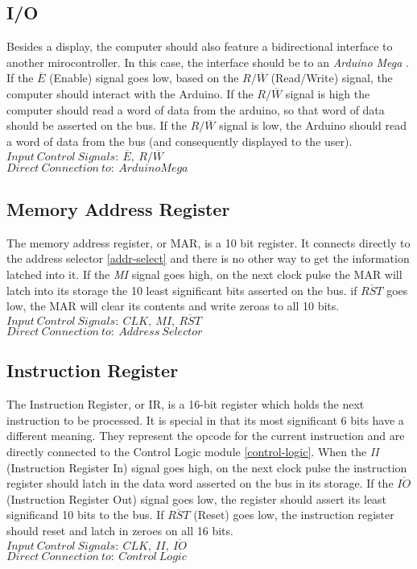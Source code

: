 \subsection{I/O} \label{io}
Besides a display, the computer should also feature a bidirectional interface to another mirocontroller. In this case,
the interface should be to an \emph{Arduino Mega} \cite{arduino2020mega}. If the \emph{$\overline{E}$} (Enable) signal goes low,
based on the \emph{$R/\overline{W}$} (Read/Write) signal, the computer should interact with the Arduino. If the
\emph{$R/\overline{W}$} signal is high the computer should read a word of data from the arduino, so that word of data should be
asserted on the bus. If the \emph{$R/\overline{W}$} signal is low, the Arduino should read a word of data from the bus (and
consequently displayed to the user). \\
\textbf{$Input\:Control\:Signals:\:\overline{E},\:R/\overline{W}$} \\
\textbf{$Direct\:Connection\:to:\:Arduino Mega$}

\subsection{Memory Address Register} \label{mar}
The memory address register, or MAR, is a 10 bit register. It connects directly to the address selector \ref{addr-select} and
there is no other way to get the information latched into it. If the \emph{MI} signal goes high, on the next clock pulse the MAR
will latch into its storage the 10 least significant bits asserted on the bus. if \emph{$\overline{RST}$} goes low, the MAR will
clear its contents and write zeroas to all 10 bits. \\
\textbf{$Input\:Control\:Signals:\:CLK,\:MI,\:\overline{RST}$} \\
\textbf{$Direct\:Connection\:to:\:Address\:Selector$}


\subsection{Instruction Register} \label{ir}
The Instruction Register, or IR, is a 16-bit register which holds the next instruction to be processed. It is special in that
its most significant 6 bits have a different meaning. They represent the opcode for the current instruction and are directly
connected to the Control Logic module \ref{control-logic}. When the \emph{II} (Instruction Register In) signal goes high, on the
next clock pulse the instruction register should latch in the data word asserted on the bus in its storage. If the
\emph{$\overline{IO}$} (Instruction Register Out) signal goes low, the register should assert its least significand 10 bits to the
bus. If \emph{$\overline{RST}$} (Reset) goes low, the instruction register should reset and latch in zeroes on all 16 bits. \\
\textbf{$Input\:Control\:Signals:\:CLK,\:II,\:\overline{IO}$} \\
\textbf{$Direct\:Connection\:to:\:Control\:Logic$}


